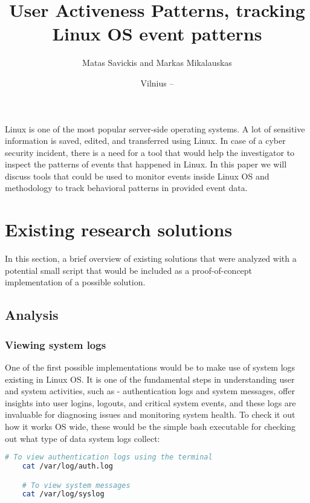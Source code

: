 \documentclass{VUMIFPSmagistrinis}
\title{User Activeness Patterns, tracking Linux OS event patterns}
\author{Matas Savickis and Markas Mikalauskas}
\date{Vilnius – \the\year}
\begin{document}

\maketitle

\tableofcontents

\begin{enumerate}
    Linux is one of the most popular server-side operating systems.
    A lot of sensitive information is saved, edited, and transferred using Linux.
    In case of a cyber security incident, there is a need for a tool that would help the investigator to inspect the patterns of events that happened in Linux.
    In this paper we will discuss tools that could be used to monitor events inside Linux OS and methodology to track behavioral patterns in provided event data.
\end{enumerate}

\section{Existing research solutions}
In this section, a brief overview of existing solutions that were analyzed with a potential small script that would be included as a proof-of-concept implementation of a possible solution. 

\subsection{Analysis}
\subsubsection{Viewing system logs}
One of the first possible implementations would be to make use of system logs existing in Linux OS. It is one of the fundamental steps in understanding user and system activities, such as - authentication logs and system messages, offer insights into user logins, logouts, and critical system events, and these logs are invaluable for diagnosing issues and monitoring system health. To check it out how it works OS wide, these would be the simple bash executable for checking out what type of data system logs collect:

\begin{lstlisting}[language=bash]
    # To view authentication logs using the terminal
    cat /var/log/auth.log 

    # To view system messages
    cat /var/log/syslog
\end{lstlisting}
\end{document}
